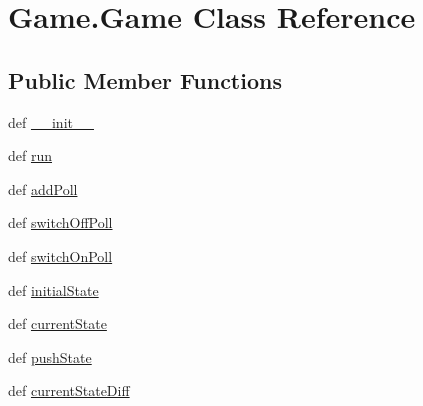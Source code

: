 \hypertarget{classGame_1_1Game}{\section{\-Game.\-Game \-Class \-Reference}
\label{classGame_1_1Game}
}
\subsection*{\-Public \-Member \-Functions}
\begin{DoxyCompactItemize}
\item 
def \hyperlink{classGame_1_1Game_a527f0ebbb5bce3e8cdfc3d4ff8a983a5}{\-\_\-\-\_\-init\-\_\-\-\_\-}
\item 
def \hyperlink{classGame_1_1Game_a37248ca770739409b6517ae924a4e4e7}{run}
\item 
def \hyperlink{classGame_1_1Game_add568019cd768b7acb98ab0c71d43393}{add\-Poll}
\item 
def \hyperlink{classGame_1_1Game_a202b94dcc6ea36d44e2b9c8848d3360b}{switch\-Off\-Poll}
\item 
def \hyperlink{classGame_1_1Game_af7ebb81ec3b8969e3dc3ae42d8446b57}{switch\-On\-Poll}
\item 
def \hyperlink{classGame_1_1Game_a9ca82128ce923d5eed173141459d70eb}{initial\-State}
\item 
def \hyperlink{classGame_1_1Game_a830019e0641847c416a2c4adfae8f43e}{current\-State}
\item 
def \hyperlink{classGame_1_1Game_a4f05d65d609b8772d3a0e01b2b6b56e1}{push\-State}
\item 
def \hyperlink{classGame_1_1Game_aa6154ca487348bae42564ff00675f0fb}{current\-State\-Diff}
\end{DoxyCompactItemize}

